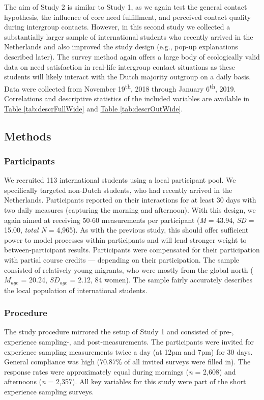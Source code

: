 \documentclass[man, 12pt, a4paper, mask]{apa7}
\theoremstyle{break}
\theoremstyle{plain}
\newcommand{\tblref}[2][]{\hyperref[#2]{Table \ref*{#2}#1}}
\begin{document}
The aim of Study 2 is similar to Study 1, as we again test the general
contact hypothesis, the influence of core need fulfillment, and
perceived contact quality during intergroup contacts. However, in this
second study we collected a substantially larger sample of international
students who recently arrived in the Netherlands and also improved the
study design (e.g., pop-up explanations described later). The survey
method again offers a large body of ecologically valid data on need
satisfaction in real-life intergroup contact situations as these
students will likely interact with the Dutch majority outgroup on a
daily basis. Data were collected from November 19\textsuperscript{th},
2018 through January 6\textsuperscript{th}, 2019. Correlations and
descriptive statistics of the included variables are available in
\tblref{tab:descrFullWide} and \tblref{tab:descrOutWide}.

\subsection{Methods}

\subsubsection{Participants}

We recruited 113 international students using a local participant pool.
We specifically targeted non-Dutch students, who had recently arrived in
the Netherlands. Participants reported on their interactions for at
least 30 days with two daily measures (capturing the morning and
afternoon). With this design, we again aimed at receiving 50-60
measurements per participant (\textit{M} = 43.94, \textit{SD} = 15.00,
\textit{total N} = 4,965). As with the previous study, this should offer
sufficient power to model processes within participants and will lend
stronger weight to between-participant results. Participants were
compensated for their participation with partial course credits ---
depending on their participation. The sample consisted of relatively
young migrants, who were mostly from the global north (\(M_{age}\) =
20.24, \(SD_{age}\) = 2.12, 84 women). The sample fairly accurately
describes the local population of international students.

\subsubsection{Procedure}

The study procedure mirrored the setup of Study 1 and consisted of pre-,
experience sampling-, and post-measurements. The participants were
invited for experience sampling measurements twice a day (at 12pm and
7pm) for 30 days. General compliance was high (70.87\% of all invited
surveys were filled in). The response rates were approximately equal
during mornings (\textit{n} = 2,608) and afternoons (\textit{n} =
2,357). All key variables for this study were part of the short
experience sampling surveys.
\end{document}
